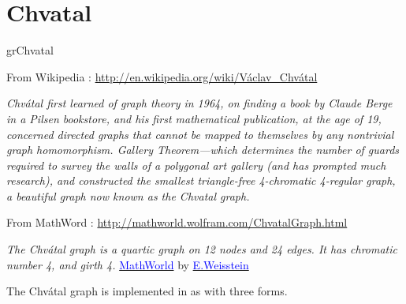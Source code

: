\newpage\section{Chvatal}
\begin{NewMacroBox}{grChvatal}{}

\medskip
From Wikipedia : \url{http://en.wikipedia.org/wiki/Václav_Chvátal} 

\emph{Chvátal first learned of graph theory in 1964, on finding a book by Claude Berge in a Pilsen bookstore, and his first mathematical publication, at the age of 19, concerned directed graphs that cannot be mapped to themselves by any nontrivial graph homomorphism.\hfill\break
Gallery Theorem—which determines the number of guards required to survey the 
walls of a polygonal art gallery (and has prompted much research), and constructed the smallest triangle-free 4-chromatic 4-regular graph, a beautiful graph now known as the Chvatal graph.}


\medskip
From MathWord : \url{http://mathworld.wolfram.com/ChvatalGraph.html}  

\emph{The Chvátal graph is a quartic graph on 12 nodes and 24 edges. It has chromatic number 4, and girth 4.}
\href{http://mathworld.wolfram.com/topics/GraphTheory.html}%
           {\textcolor{blue}{MathWorld}} by \href{http://en.wikipedia.org/wiki/Eric_W._Weisstein}%
           {\textcolor{blue}{E.Weisstein}}

\medskip
The Chvátal graph is implemented in  as  with three forms.
\end{NewMacroBox}

\medskip
\subsection{}

\bigskip

\begin{center}
  \begin{tkzexample}[vbox]
  \end{tkzexample}

\end{center}

